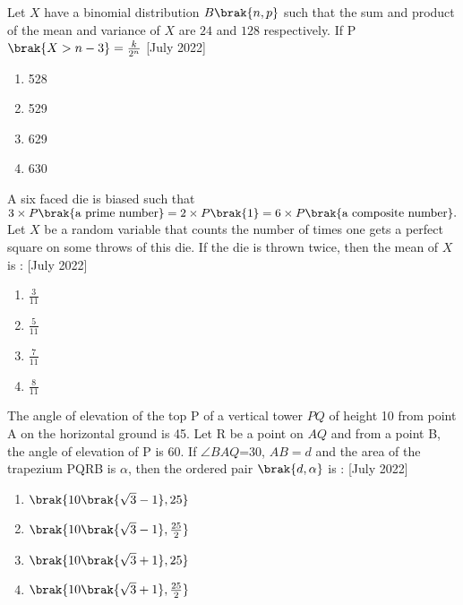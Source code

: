 \iffalse
  \title{2022}
  \author{ai24btech11005}
  \section{mcq-single}
\fi


    \item Let $X$ have  a binomial distribution $B\brak{n,p}$ such that the sum and product of the mean and variance of $X$  are $24$ and $128$ respectively. If P$\brak{X>n-3}=\frac{k}{2^n}$
\hfill{[July 2022]}
        \begin{multicols}{4}
            \begin{enumerate}
                \item 528
                \item 529
                \item 629
                \item 630
            \end{enumerate}
        \end{multicols}

    \item A six faced die is biased such that $3\times P\brak{\text{a prime number}}=2\times P\brak{1}=6\times P\brak{\text{a composite number}}.$ Let $X$ be a random variable that counts the number of times one gets a perfect square on some throws of this die. If the die is thrown twice, then the mean of $X$ is :
\hfill{[July 2022]}
		\begin{multicols}{1}
			\begin{enumerate}
				\item $\frac{3}{11}$
				\item $\frac{5}{11}$
				\item $\frac{7}{11}$
				\item $\frac{8}{11}$
			\end{enumerate}
		\end{multicols}

    \item The angle of elevation of the top P of a vertical tower $PQ$ of height 10 from point A on the horizontal ground is 45\textdegree. Let R be a point on $AQ$ and from a point B, the angle of elevation of P is 60\textdegree. If $\angle BAQ$=30\textdegree, $AB=d$ and the area of the trapezium PQRB is $\alpha$, then the ordered pair $\brak{d,\alpha}$ is :
 \hfill{[July 2022]}
        \begin{multicols}{1}
            \begin{enumerate}
                \item $\brak{10\brak{\sqrt{3}-1},25}$
                \item $\brak{10\brak{\sqrt{3}-1},\frac{25}{2}}$
                \item $\brak{10\brak{\sqrt{3}+1},25}$
                \item $\brak{10\brak{\sqrt{3}+1},\frac{25}{2}}$
            \end{enumerate}
        \end{multicols}

